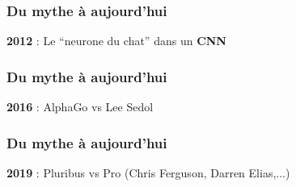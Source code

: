 \begin{frame}
  \frametitle{Du mythe à aujourd'hui}
  \textbf{2012} : Le ``neurone du chat'' dans un \textbf{CNN}
\end{frame}

\begin{frame}
  \frametitle{Du mythe à aujourd'hui}
  \textbf{2016} : AlphaGo vs Lee Sedol
\end{frame}

\begin{frame}
  \frametitle{Du mythe à aujourd'hui}
  \textbf{2019} : Pluribus vs Pro (Chris Ferguson, Darren Elias,...)
\end{frame}

